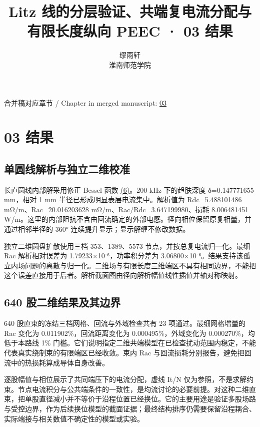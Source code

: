 \documentclass[11pt]{article}
\begin{document}
\title{Litz 线的分层验证、共端复电流分配与有限长度纵向 PEEC · 03 结果}
\author{缪雨轩\\淮南师范学院}
\date{}
\maketitle
\noindent 合并稿对应章节 / Chapter in merged manuscript: \href{paper_zh-CN_single.pdf#chapter-03}{03}\par
\FloatBarrier
\section*{03 结果}
\hypertarget{chapter-03}{}
\subsection*{单圆线解析与独立二维校准}
\hypertarget{03.analytic.heading}{}
长直圆线内部解采用修正 Bessel 函数 \href{paper_zh-CN_single.pdf#E03}{(6)}。200 kHz 下的趋肤深度 δ=0.147771655 mm，相对 1 mm 半径已形成明显表层电流集中。解析值为 Rdc=5.488101486 mΩ/m、Rac=20.016203628 mΩ/m、Rac/Rdc=3.647199980、损耗 8.006481451 W/m。这里的内部阻抗不含由回流确定的外部电感。径向相位保留原复相量，并通过相邻半径的 360° 连续提升显示；显示解缠不修改数据。


独立二维圆盘扩散使用三档 353、1389、5573 节点，并按总复电流归一化。最细 Rac 解析相对误差为 1.79233×10⁻⁶，功率积分差为 3.06800×10⁻⁶。结果支持该孤立内场问题的离散与归一化。二维场与有限长度三维端区不具有相同边界，不能把这个误差直接用于后者。解析截面图由径向解析幅值线性插值并轴对称映射。


\subsection*{640 股二维结果及其边界}
\hypertarget{03.coax_results.heading}{}
640 股直束的冻结三档网格、回流与外域检查共有 23 项通过。最细网格增量的 Rac 变化为 0.011902\%，回流距离变化为 0.000495\%，外域变化为 0.000270\%，均低于本路线 1\% 门槛。它们说明指定二维共端模型在已检查扰动范围内稳定，不能代表真实绕制束的有限端区已经收敛。束内 Rac 与回流损耗分别报告，避免把回流中的热损耗算成导体自身改善。


逐股幅值与相位展示了共同端压下的电流分配，虚线 It/N 仅为参照，不是求解约束。节点电流积分与公共端条件的一致性，是均流讨论的必要前提。对这种二维直束，把单股直径减小并不等价于沿程位置已经换位。它的主要用途是验证多股场路与受控边界，作为后续换位模型的截面证据；最终结构排序仍需要保留沿程耦合、实际端接与相关数值不确定性的模型或实验。
\end{document}
